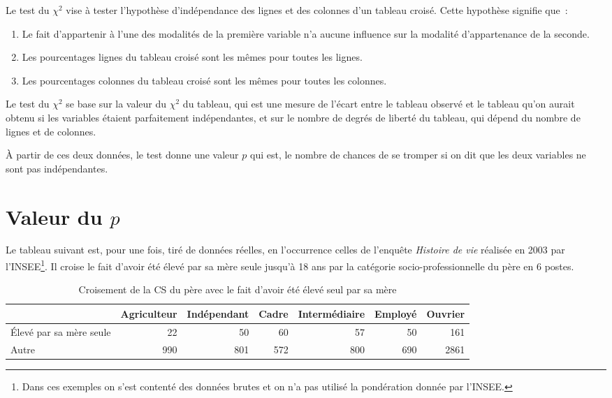 \documentclass[a4paper,10pt,twoside,francais]{report}
\newcommand{\chid}{$\chi^2$\xspace}
\begin{document}
Le test du \chid vise à tester l'hypothèse d'indépendance des lignes
et des colonnes d'un tableau croisé. Cette hypothèse signifie que~:
\begin{enumerate}
\item Le fait d'appartenir à l'une des modalités de la première
  variable n'a aucune influence sur la modalité d'appartenance de la
  seconde.
\item Les pourcentages lignes du tableau croisé sont les mêmes pour
  toutes les lignes.
\item Les pourcentages colonnes du tableau croisé sont les mêmes pour
  toutes les colonnes.
\end{enumerate}

Le test du \chid se base sur la valeur du \chid du tableau, qui est
une mesure de l'écart entre le tableau observé et le tableau qu'on
aurait obtenu si les variables étaient parfaitement indépendantes, et
sur le nombre de degrés de liberté du tableau, qui dépend du nombre de
lignes et de colonnes.

À partir de ces deux données, le test donne une valeur $p$ qui est, le
nombre de chances de se tromper si on dit que les deux variables ne
sont pas indépendantes.


\section{Valeur du \texorpdfstring{$p$}{p}}
\label{ssec-valp}


Le tableau suivant est, pour une fois, tiré de données réelles, en
l'occurrence celles de l'enquête \textit{Histoire de vie} réalisée en
2003 par l'INSEE\footnote{Dans ces exemples on s'est contenté des
  données brutes et on n'a pas utilisé la pondération donnée par
  l'INSEE.}. Il croise le fait d'avoir été élevé par sa mère seule
jusqu'à 18 ans par la catégorie socio-professionnelle du père en 6
postes.


\begin{table}[H]
  \begin{center}
    \small
    \begin{tabular}[!h]{lrrrrrr}
      \toprule
      & Agriculteur & Indépendant & Cadre & Intermédiaire & Employé & Ouvrier\\
      \midrule
      Élevé par sa mère seule & 22 & 50 & 60 & 57 & 50 & 161 \\
      Autre & 990 & 801 & 572 & 800 & 690 & 2861 \\
      \bottomrule
    \end{tabular}
  \end{center}
  \caption{Croisement de la CS du père avec le fait d'avoir été élevé
    seul par sa mère}
  \label{cselev}
  \normalsize
\end{table}
\end{document}
